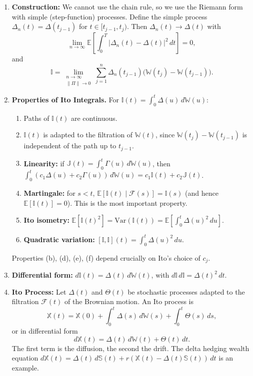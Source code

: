\begin{enumerate}
    \item \textbf{Construction:} We cannot use the chain rule, so we use the Riemann form with simple (step-function) processes. Define the simple process $\Delta_n(t) = \Delta(t_{j-1})$ for $t \in [t_{j-1}, t_j)$. Then $\Delta_n(t) \to \Delta(t)$ with
    \[\lim_{n \to \infty}\mathbb{E}\left[\int_0^T |\Delta_n(t) - \Delta(t)|^2\, dt\right] = 0,\]
    and
    \[\mathbb{I} = \lim_{\substack{n \to \infty \\ \|\Pi\| \to 0}} \sum_{j=1}^{n}\Delta_n(t_{j-1})\bigl(\mathbb{W}(t_j) - \mathbb{W}(t_{j-1})\bigr).\]

    \item \textbf{Properties of Ito Integrals.} For $\mathbb{I}(t) = \int_0^t \Delta(u)\, d\mathbb{W}(u)$:
    \begin{enumerate}
        \item Paths of $\mathbb{I}(t)$ are continuous.
        \item $\mathbb{I}(t)$ is adapted to the filtration of $\mathbb{W}(t)$, since $\mathbb{W}(t_j) - \mathbb{W}(t_{j-1})$ is independent of the path up to $t_{j-1}$.
        \item \textbf{Linearity:} if $\mathbb{J}(t) = \int_0^t \Gamma(u)\, d\mathbb{W}(u)$, then $\int_0^t (c_1\Delta(u) + c_2\Gamma(u))\, d\mathbb{W}(u) = c_1\mathbb{I}(t) + c_2\mathbb{J}(t)$.
        \item \textbf{Martingale:} for $s < t$, $\mathbb{E}[\mathbb{I}(t) \mid \mathcal{F}(s)] = \mathbb{I}(s)$ (and hence $\mathbb{E}[\mathbb{I}(t)] = 0$). This is the most important property.
        \item \textbf{Ito isometry:} $\mathbb{E}[\mathbb{I}(t)^2] = \text{Var}(\mathbb{I}(t)) = \mathbb{E}\left[\int_0^t \Delta(u)^2\, du\right]$.
        \item \textbf{Quadratic variation:} $[\mathbb{I}, \mathbb{I}](t) = \int_0^t \Delta(u)^2\, du$.
    \end{enumerate}
    Properties (b), (d), (e), (f) depend crucially on Ito's choice of $c_j$.

    \item \textbf{Differential form:} $d\mathbb{I}(t) = \Delta(t)\, d\mathbb{W}(t)$, with $d\mathbb{I}\, d\mathbb{I} = \Delta(t)^2\, dt$.

    \item \textbf{Ito Process:} Let $\Delta(t)$ and $\Theta(t)$ be stochastic processes adapted to the filtration $\mathcal{F}(t)$ of the Brownian motion. An Ito process is
    \[\mathbb{X}(t) = \mathbb{X}(0) + \int_0^t \Delta(s)\, d\mathbb{W}(s) + \int_0^t \Theta(s)\, ds,\]
    or in differential form
    \[d\mathbb{X}(t) = \Delta(t)\, d\mathbb{W}(t) + \Theta(t)\, dt.\]
    The first term is the diffusion, the second the drift. The delta hedging wealth equation $d\mathbb{X}(t) = \Delta(t)\, d\mathbb{S}(t) + r(\mathbb{X}(t) - \Delta(t)\mathbb{S}(t))\, dt$ is an example.


\end{enumerate}
